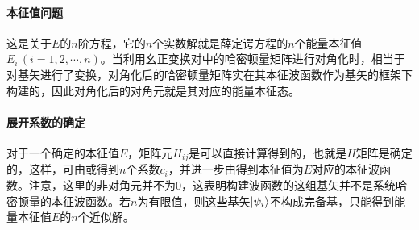 \paragraph*{本征值问题}
这是关于$E$的$n$阶方程，它的$n$个实数解就是薛定谔方程的$n$个能量本征值$E_{i}\,(i = 1, 2, \cdots, n)$。当利用幺正变换对中的哈密顿量矩阵进行对角化时，相当于对基矢进行了变换，对角化后的哈密顿量矩阵实在其本征波函数作为基矢的框架下构建的，因此对角化后的对角元就是其对应的能量本征态。

\paragraph*{展开系数的确定}
对于一个确定的本征值$E$，矩阵元$H_{ij}$是可以直接计算得到的，也就是$H$矩阵是确定的，这样，可由或得到$n$个系数$c_{i}$，并进一步由得到本征值为$E$对应的本征波函数。注意，这里的非对角元并不为0，这表明构建波函数的这组基矢并不是系统哈密顿量的本征波函数。若$n$为有限值，则这些基矢$\ket{\psi_i}$不构成完备基，只能得到能量本征值$E$的$n$个近似解。

